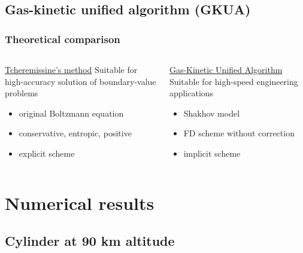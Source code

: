 \documentclass[mathserif]{beamer} %
\begin{document}
\subsection[]{Gas-kinetic unified algorithm (GKUA)}

\begin{frame}
    \frametitle{Theoretical comparison}
    \begin{columns}[T]
        \begin{column}{6cm}
            \begin{block}{\centering \underline{Tcheremissine's method}}
                Suitable for high-accuracy solution of boundary-value problems
                \begin{itemize}
                    \item original Boltzmann equation
                    \item conservative, entropic, positive
                    \item explicit scheme
                \end{itemize}
            \end{block}
        \end{column}
        \begin{column}{6cm}
            \begin{block}{\centering \underline{Gas-Kinetic Unified Algorithm}}
                Suitable for high-speed engineering applications
                \begin{itemize}
                    \item Shakhov model
                    \item FD scheme without correction
                    \item implicit scheme
                \end{itemize}
            \end{block}
        \end{column}
    \end{columns}
\end{frame}

\section{Numerical results}

\subsection[]{Cylinder at 90 km altitude}
\end{document}
